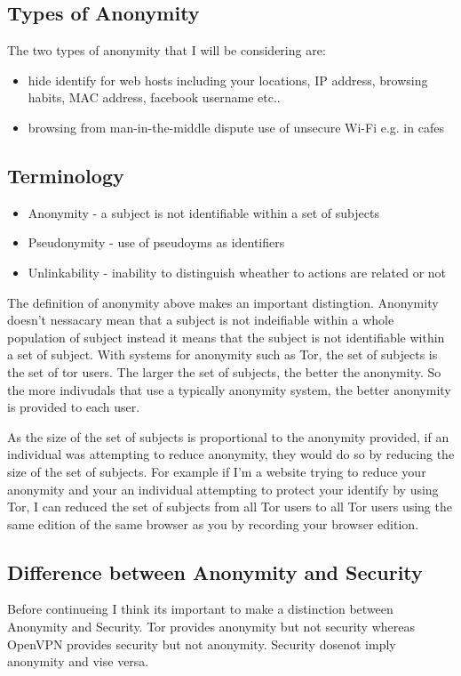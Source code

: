 \documentclass[12pt,a4paper,oneside]{article}
\begin{document}
\subsection{Types of Anonymity}
The two types of anonymity that I will be considering are:
\begin{itemize}
\item hide identify for web hosts including your locations, IP address, browsing habits, MAC address, facebook username etc..
\item browsing from man-in-the-middle dispute use of unsecure Wi-Fi e.g. in cafes 
\end{itemize}

\subsection{Terminology}

\begin{itemize}
\item Anonymity - a subject is not identifiable within a set of subjects
\item Pseudonymity - use of pseudoyms as identifiers
\item Unlinkability - inability to distinguish wheather to actions are related or not
\end{itemize}

The definition of anonymity above makes an important distingtion. Anonymity doesn't nessacary mean that a subject is not indeifiable within a whole population of subject instead it means that the subject is not identifiable within a set of subject. With systems for anonymity such as Tor, the set of subjects is the set of tor users. The larger the set of subjects, the better the anonymity. So the more indivudals that use a typically anonymity system, the better anonymity is provided to each user. 

As the size of the set of subjects is proportional to the anonymity provided, if an individual was attempting to reduce anonymity, they would do so by reducing the size of the set of subjects. For example if I'm a website trying to reduce your anonymity and your an individual attempting to protect your identify by using Tor, I can reduced the set of subjects from all Tor users to all Tor users using the same edition of the same browser as you by recording your browser edition.

\subsection{Difference between Anonymity and Security}
Before continueing I think its important to make a distinction between Anonymity and Security. Tor provides anonymity but not security whereas OpenVPN provides security but not anonymity. Security dosenot imply anonymity and vise versa.
\end{document}
